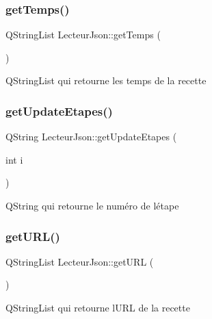 \subsubsection{\texorpdfstring{get\+Temps()}{getTemps()}}
{\footnotesize\ttfamily Q\+String\+List Lecteur\+Json\+::get\+Temps (\begin{DoxyParamCaption}{ }\end{DoxyParamCaption})\hspace{0.3cm}{\ttfamily [inline]}}

Q\+String\+List qui retourne les temps de la recette \mbox{\label{class_lecteur_json_ad3a86b8dc577d1e6d77a66b8ece8442a}} 
\subsubsection{\texorpdfstring{get\+Update\+Etapes()}{getUpdateEtapes()}}
{\footnotesize\ttfamily Q\+String Lecteur\+Json\+::get\+Update\+Etapes (\begin{DoxyParamCaption}\item[{int}]{i }\end{DoxyParamCaption})\hspace{0.3cm}{\ttfamily [inline]}}

Q\+String qui retourne le numéro de l\textquotesingle{}étape \mbox{\label{class_lecteur_json_a4ceacda970b2b838bb41211decdd799f}} 
\subsubsection{\texorpdfstring{get\+U\+R\+L()}{getURL()}}
{\footnotesize\ttfamily Q\+String\+List Lecteur\+Json\+::get\+U\+RL (\begin{DoxyParamCaption}{ }\end{DoxyParamCaption})\hspace{0.3cm}{\ttfamily [inline]}}

Q\+String\+List qui retourne l\textquotesingle{}U\+RL de la recette \mbox{\label{class_lecteur_json_a6b74dbecd8cb87168fb2d36bc1a22f2b}} 
